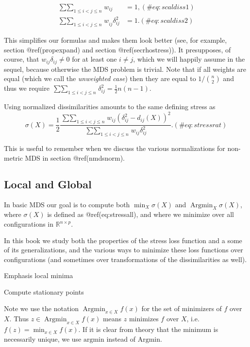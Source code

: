 \documentclass[
  12pt,
  letterpaper,
  DIV=11,
  numbers=noendperiod]{scrartcl}
\begin{document}
\begin{align}
\mathop{\sum\sum}_{1\leq i<j\leq n}w_{ij}&=1,(\#eq:scaldiss1)\\
\mathop{\sum\sum}_{1\leq i<j\leq n}w_{ij}^{\ }\delta_{ij}^2&=1.(\#eq:scaldiss2)
\end{align}

This simplifies our formulas and makes them look better (see, for
example, section @ref(propexpand) and section @ref(secrhostress)). It
presupposes, of course, that \(w_{ij}\delta_{ij}\not=0\) for at least
one \(i\not= j\), which we will happily assume in the sequel, because
otherwise the MDS problem is trivial. Note that if all weights are equal
(which we call the \emph{unweighted case}) then they are equal to
\(1/\binom{n}{2}\) and thus we require
\(\mathop{\sum\sum}_{1\leq i<j\leq n}\delta_{ij}^2=\frac12n(n-1)\).

Using normalized dissimilarities amounts to the same defining stress as
\begin{equation}
\sigma(X)=\frac12\frac{\mathop{\sum\sum}_{1\leq i<j\leq n}w_{ij}(\delta_{ij}^2-d_{ij}(X))^2}{\mathop{\sum\sum}_{1\leq i<j\leq n}w_{ij}\delta_{ij}^2}.
(\#eq:stressrat)
\end{equation}

This is useful to remember when we discuss the various normalizations
for non-metric MDS in section @ref(nmdsnorm).

\subsection{Local and Global}\label{seclocglob}

In basic MDS our goal is to compute both \(\min_X\sigma(X)\) and
\(\mathop{\text{Argmin}}_X\sigma(X)\), where \(\sigma(X)\) is defined as
@ref(eq:stressall), and where we minimize over all configurations in
\(\mathbb{R}^{n\times p}\).

In this book we study both the properties of the stress loss function
and a some of its generalizations, and the various ways to minimize
these loss functions over configurations (and sometimes over
transformations of the dissimilarities as well).

Emphasis local minima

Compute stationary points

Note we use the notation \(\mathop{\text{Argmin}}_{x\in X}f(x)\) for the
set of minimizers of \(f\) over \(X\). Thus
\(z\in\mathop{\text{Argmin}}_{x\in X}f(x)\) means \(z\) minimizes \(f\)
over \(X\), i.e.~\(f(z)=\min_{x\in X} f(x)\). If it is clear from theory
that the minimum is necessarily unique, we use \(\text{argmin}\) instead
of \(\text{Argmin}\).
\end{document}

